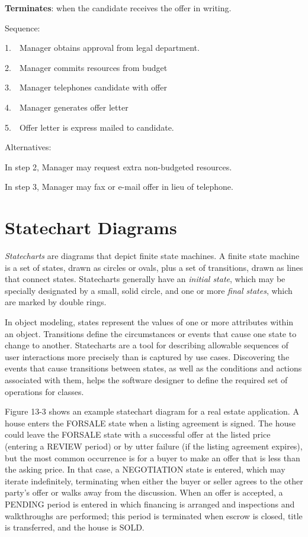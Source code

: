 \textbf{Terminates}: when the candidate receives the offer in writing.

Sequence:

1.\ \ Manager obtains approval from legal department.

2.\ \ Manager commits resources from budget

3.\ \ Manager telephones candidate with offer

4.\ \ Manager generates offer letter

5.\ \ Offer letter is express mailed to candidate.

Alternatives:

In step 2, Manager may request extra non-budgeted resources.

In step 3, Manager may fax or e-mail offer in lieu of telephone.

\section{Statechart Diagrams}

\textit{Statecharts} are diagrams that depict finite
state machines. A finite state machine is a
set of states, drawn as circles or ovals, plus a set of transitions,
drawn as lines that connect states. Statecharts generally have an
\textit{initial state}, which may be specially designated by a small,
solid circle, and one or more \textit{final states}, which are marked
by double rings.

In object modeling, states represent the values of one or more
attributes within an object. Transitions define the circumstances or
events that cause one state to change to another. Statecharts are a
tool for describing allowable sequences of user interactions more
precisely than is captured by use cases. Discovering the events that
cause transitions between states, as well as the conditions and actions
associated with them, helps the software designer to define the
required set of operations for classes.

Figure 13-3 shows an example statechart diagram for a real estate
application. A house enters the FORSALE state when a listing agreement
is signed. The house could leave the FORSALE state with a successful
offer at the listed price (entering a REVIEW period) or by utter
failure (if the listing agreement expires), but the most common
occurrence is for a buyer to make an offer that is less than the asking
price. In that case, a NEGOTIATION state is entered, which may iterate
indefinitely, terminating when either the buyer or seller agrees to the
other party's offer or walks away from the discussion.
When an offer is accepted, a PENDING period is entered in which
financing is arranged and inspections and walkthroughs are performed;
this period is terminated when escrow is closed, title is transferred,
and the house is SOLD.


